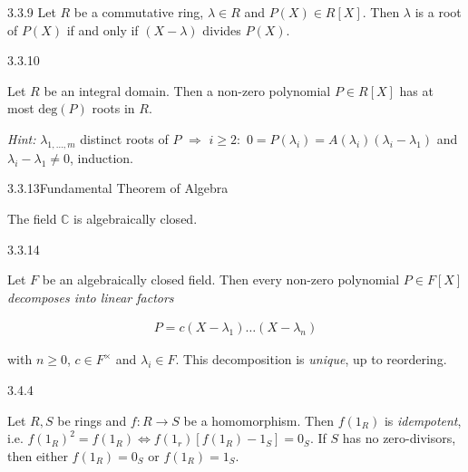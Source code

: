 \documentclass[10pt]{article} %
\renewcommand{\geq}{\geqslant}
\newcommand{\Hint}{\vspace{0.2em}\textit{Hint: }}
\begin{document}
\begin{multicols}{3}
\begin{proposition}{3.3.9}{}
    Let $R$ be a commutative ring, $\lambda \in R$ and $P(X) \in R[X]$. Then $\lambda$ is a root of $P(X)$ if and only if $(X - \lambda)$ divides $P(X)$.

\end{proposition}

\begin{theorem}{3.3.10}{}

    Let $R$ be an integral domain. Then a non-zero polynomial $P \in R[X]$ has at most $\mathrm{deg}(P)$ roots in $R$.

    \Hint $\lambda_{1,\hdots,m}$ distinct roots of $P$ $\Rightarrow$ $i \geq 2:$ $0 = P(\lambda_i) = A(\lambda_i)(\lambda_i - \lambda_1)$ and $\lambda_i - \lambda_1 \neq 0$, induction.

\end{theorem}

\begin{theorem}{3.3.13}{Fundamental Theorem of Algebra}

    The field $\mathbb{C}$ is algebraically closed.

\end{theorem}

\begin{theorem}{3.3.14}{}

    Let $F$ be an algebraically closed field. Then every non-zero polynomial $P \in F[X]$ \emph{decomposes into linear factors}

        \begin{align*}
            P = c(X - \lambda_1)\hdots(X - \lambda_n)
        \end{align*}

    with $n \geq 0$, $c \in F^{\times}$ and $\lambda_i \in F$. This decomposition is \emph{unique}, up to reordering.

\end{theorem}

\begin{remark}{3.4.4}{}

    Let $R,S$ be rings and $f: R \to S$ be a homomorphism. Then $f(1_R)$ is \emph{idempotent}, i.e. $f(1_R)^2=f(1_R) \Leftrightarrow f(1_r)[f(1_R) - 1_S]=0_S$. If $S$ has no zero-divisors, then either $f(1_R) = 0_S$ or $f(1_R) = 1_S$.

\end{remark}


\end{multicols}
\end{document}
